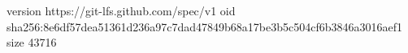 version https://git-lfs.github.com/spec/v1
oid sha256:8e6df57dea51361d236a97c7dad47849b68a17be3b5c504cf6b3846a3016aef1
size 43716
